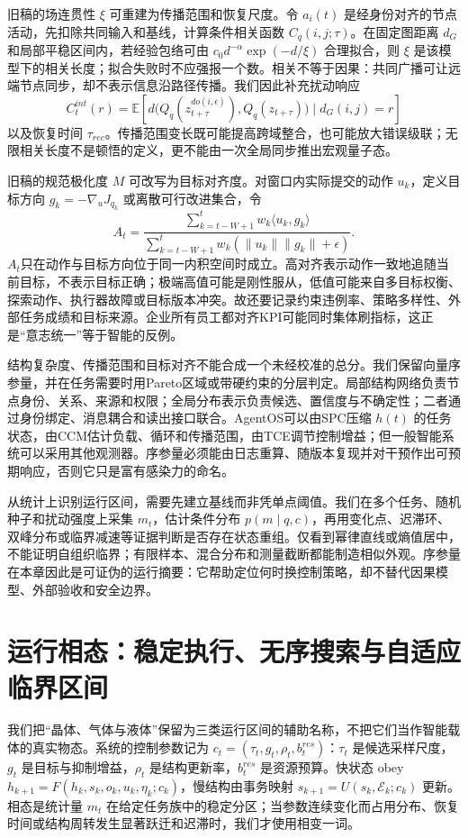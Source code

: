 旧稿的场连贯性 $\xi$ 可重建为传播范围和恢复尺度。令 $a_i(t)$ 是经身份对齐的节点活动，先扣除共同输入和基线，计算条件相关函数 $C_q(i,j;\tau)$。在固定图距离 $d_G$ 和局部平稳区间内，若经验包络可由 $c_0d^{-\alpha}\exp(-d/\xi)$ 合理拟合，则 $\xi$ 是该模型下的相关长度；拟合失败时不应强报一个数。相关不等于因果：共同广播可让远端节点同步，却不表示信息沿路径传播。我们因此补充扰动响应
\[
 C_t^{int}(r)=\mathbb E\left[d\bigl(Q_q(z_{t+\tau}^{do(i,\epsilon)}),Q_q(z_{t+\tau})\bigr)\mid d_G(i,j)=r\right]
\]
以及恢复时间 $\tau_{rec}$。传播范围变长既可能提高跨域整合，也可能放大错误级联；无限相关长度不是顿悟的定义，更不能由一次全局同步推出宏观量子态。

旧稿的规范极化度 $M$ 可改写为目标对齐度。对窗口内实际提交的动作 $u_k$，定义目标方向 $g_k=-\nabla_uJ_{q_k}$ 或离散可行改进集合，令
\[
 A_t=\frac{\sum_{k=t-W+1}^{t}w_k\langle u_k,g_k\rangle}
 {\sum_{k=t-W+1}^{t}w_k(\|u_k\|\|g_k\|+\epsilon)}.
\]
$A_t$只在动作与目标方向位于同一内积空间时成立。高对齐表示动作一致地追随当前目标，不表示目标正确；极端高值可能是刚性服从，低值可能来自多目标权衡、探索动作、执行器故障或目标版本冲突。故还要记录约束违例率、策略多样性、外部任务成绩和目标来源。企业所有员工都对齐KPI可能同时集体刷指标，这正是“意志统一”等于智能的反例。

结构复杂度、传播范围和目标对齐不能合成一个未经校准的总分。我们保留向量序参量，并在任务需要时用Pareto区域或带硬约束的分层判定。局部结构网络负责节点身份、关系、来源和权限；全局分布表示负责候选、置信度与不确定性；二者通过身份绑定、消息耦合和读出接口联合。AgentOS可以由SPC压缩 $h(t)$ 的任务状态，由CCM估计负载、循环和传播范围，由TCE调节控制增益；但一般智能系统可以采用其他观测器。序参量必须能由日志重算、随版本复现并对干预作出可预期响应，否则它只是富有感染力的命名。

从统计上识别运行区间，需要先建立基线而非凭单点阈值。我们在多个任务、随机种子和扰动强度上采集 $m_t$，估计条件分布 $p(m\mid q,c)$，再用变化点、迟滞环、双峰分布或临界减速等证据判断是否存在状态重组。仅看到幂律直线或熵值居中，不能证明自组织临界；有限样本、混合分布和测量截断都能制造相似外观。序参量在本章因此是可证伪的运行摘要：它帮助定位何时换控制策略，却不替代因果模型、外部验收和安全边界。

\section{运行相态：稳定执行、无序搜索与自适应临界区间}
\label{sec:section_6651}

我们把“晶体、气体与液体”保留为三类运行区间的辅助名称，不把它们当作智能载体的真实物态。系统的控制参数记为 $c_t=(\tau_t,g_t,\rho_t,b_t^{res})$：$\tau_t$ 是候选采样尺度，$g_t$ 是目标与抑制增益，$\rho_t$ 是结构更新率，$b_t^{res}$ 是资源预算。快状态 obey $h_{k+1}=F(h_k,s_k,o_k,u_k,\eta_k;c_k)$，慢结构由事务映射 $s_{k+1}=U(s_k,\mathcal E_k;c_k)$ 更新。相态是统计量 $m_t$ 在给定任务族中的稳定分区；当参数连续变化而占用分布、恢复时间或结构周转发生显著跃迁和迟滞时，我们才使用相变一词。

